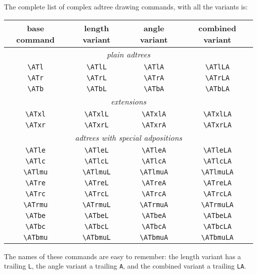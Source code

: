 \documentclass{amsart}
\begin{document}
The complete list of complex adtree drawing commands, with all the
variants is:
\begin{center}
  \begin{tabular}{cccc}\renewcommand{\arraystretch}{1.3}
    \textbf{base command} & \textbf{length variant} & \textbf{angle
      variant} & \textbf{combined variant}\\ 
    \hline\hline
    \multicolumn{4}{c}{{\huge\strut}\emph{plain adtrees}}\\
    \verb|\ATl| & \verb|\ATlL| & \verb|\ATlA| & \verb|\ATlLA|\\
    \verb|\ATr| & \verb|\ATrL| & \verb|\ATrA| & \verb|\ATrLA|\\
    \verb|\ATb| & \verb|\ATbL| & \verb|\ATbA| & \verb|\ATbLA|\\
    \hline
    \multicolumn{4}{c}{{\huge\strut}\emph{extensions}}\\
    \verb|\ATxl| & \verb|\ATxlL| & \verb|\ATxlA| & \verb|\ATxlLA|\\
    \verb|\ATxr| & \verb|\ATxrL| & \verb|\ATxrA| & \verb|\ATxrLA|\\
    \hline
    \multicolumn{4}{c}{{\huge\strut}\emph{adtrees with special
        adpositions}}\\ 
    \verb|\ATle| & \verb|\ATleL| & \verb|\ATleA| & \verb|\ATleLA|\\
    \verb|\ATlc| & \verb|\ATlcL| & \verb|\ATlcA| & \verb|\ATlcLA|\\
    \verb|\ATlmu| & \verb|\ATlmuL| & \verb|\ATlmuA| & \verb|\ATlmuLA|\\ 
    \verb|\ATre| & \verb|\ATreL| & \verb|\ATreA| & \verb|\ATreLA|\\
    \verb|\ATrc| & \verb|\ATrcL| & \verb|\ATrcA| & \verb|\ATrcLA|\\
    \verb|\ATrmu| & \verb|\ATrmuL| & \verb|\ATrmuA| & \verb|\ATrmuLA|\\ 
    \verb|\ATbe| & \verb|\ATbeL| & \verb|\ATbeA| & \verb|\ATbeLA|\\
    \verb|\ATbc| & \verb|\ATbcL| & \verb|\ATbcA| & \verb|\ATbcLA|\\
    \verb|\ATbmu| & \verb|\ATbmuL| & \verb|\ATbmuA| & \verb|\ATbmuLA|\\ 
    \hline
  \end{tabular}
\end{center}
The names of these commands are easy to remember: the length variant
has a trailing \verb|L|, the angle variant a trailing \verb|A|, and
the combined variant a trailing \verb|LA|.  
\end{document}
